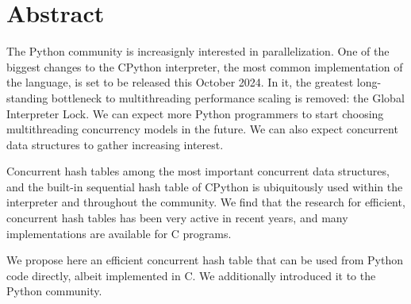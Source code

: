 \chapter*{Abstract}
\label{ch:abstract}


The Python community is increasignly interested in parallelization.
One of the biggest changes to the CPython interpreter, the most common implementation of the language, is set to be released this October 2024.
In it, the greatest long-standing bottleneck to multithreading performance scaling is removed: the Global Interpreter Lock.
We can expect more Python programmers to start choosing multithreading concurrency models in the future.
We can also expect concurrent data structures to gather increasing interest.

Concurrent hash tables among the most important concurrent data structures, and the built-in sequential hash table of CPython is ubiquitously used within the interpreter and throughout the community.
We find that the research for efficient, concurrent hash tables has been very active in recent years, and many implementations are available for C programs.

We propose here an efficient concurrent hash table that can be used from Python code directly, albeit implemented in C.
We additionally introduced it to the Python community.
